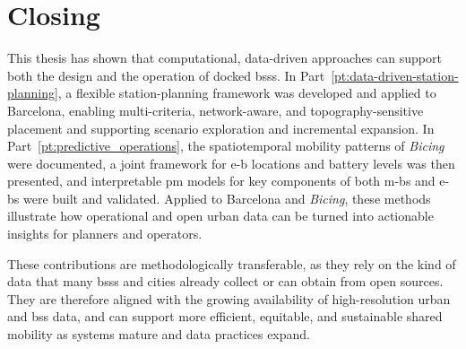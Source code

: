 \section{Closing}
\label{sec:conclusions_closing}

This thesis has shown that computational, data-driven approaches can support both the design and the operation of docked \acp{bss}. In Part~\ref{pt:data-driven-station-planning}, a flexible station-planning framework was developed and applied to Barcelona, enabling multi-criteria, network-aware, and topography-sensitive placement and supporting scenario exploration and incremental expansion. In Part~\ref{pt:predictive_operations}, the spatiotemporal mobility patterns of \textit{Bicing} were documented, a joint framework for \ac{e-b} locations and battery levels was then presented, and interpretable \ac{pm} models for key components of both \acp{m-b} and \acp{e-b} were built and validated. Applied to Barcelona and \textit{Bicing}, these methods illustrate how operational and open urban data can be turned into actionable insights for planners and operators. 

These contributions are methodologically transferable, as they rely on the kind of data that many \acp{bss} and cities already collect or can obtain from open sources. They are therefore aligned with the growing availability of high-resolution urban and \ac{bss} data, and can support more efficient, equitable, and sustainable shared mobility as systems mature and data practices expand.
